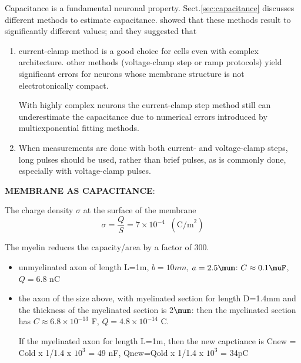 Capacitance is a fundamental neuronal property. 
Sect.\ref{sec:capacitance} discusses  different methods to estimate capacitance.
\citep{golowasch2009} showed that these methods result to significantly
different values; and they suggested that
\begin{enumerate}
  \item  current-clamp method is a good choice for cells even with complex
  architecture. other methods (voltage-clamp step or ramp protocols) yield
  significant errors for neurons whose membrane structure is not electrotonically compact.

With highly complex neurons the current-clamp step method still can
underestimate the capacitance due to numerical errors introduced by
multiexponential fitting methods.

   \item When measurements are done with both current- and voltage-clamp steps,
   long pulses should be used, rather than brief pulses, as is commonly done,
   especially with voltage-clamp pulses.
\end{enumerate}



{\bf MEMBRANE AS CAPACITANCE}: 


The charge density $\sigma$ at the surface of the membrane
\begin{equation}
\sigma	= \frac{Q}{S} = 7\times 10^{-4} \;\;(\text{C/m}^2)
\end{equation}

The myelin reduces the capacity/area by a factor of 300.
\begin{itemize}
  \item unmyelinated axon of length L=1m, $b=10nm$, $a=2.5\mum$: $C \approx 0.1
  \muF$, $Q = 6.8$ nC
  \item the axon of the size above, with myelinated section for length D=1.4mm
  and the thickness of the myelinated section is 2$\mum$: then the myelinated
  section has $C \approx 6.8 \times 10^{-13}$ F, $Q=4.8\times 10^{-14}$ C.
  
  If the myelinated axon for length L=1m, then the new capctiance is Cnew = Cold
  x 1/1.4 x $10^3$ = 49 nF, Qnew=Qold x 1/1.4 x $10^3$ = 34pC
\end{itemize}



